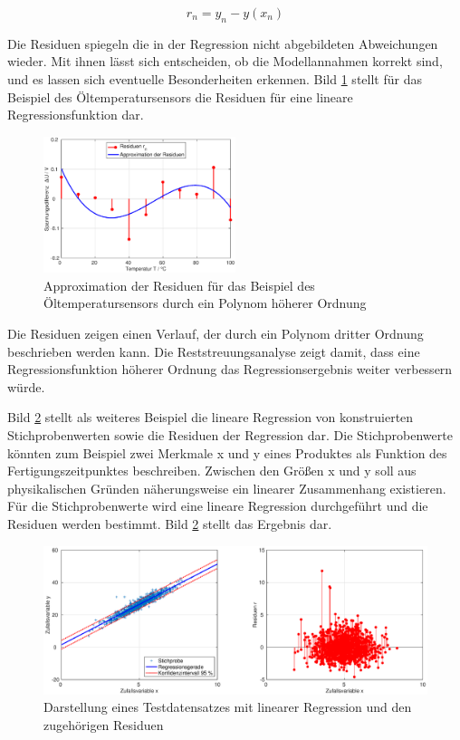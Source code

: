 \begin{equation}\label{eq:twelveonehundredthirtythree}
r_{n} =y_{n} -y(x_{n})
\end{equation}

\noindent Die Residuen spiegeln die in der Regression nicht abgebildeten Abweichungen wieder. Mit ihnen l\"{a}sst sich entscheiden, ob die Modellannahmen korrekt sind, und es lassen sich eventuelle Besonderheiten erkennen. Bild \ref{fig:RegressionLinearOeltemperatur9} stellt f\"{u}r das Beispiel des \"{O}ltemperatursensors die Residuen f\"{u}r eine lineare Regressionsfunktion dar.

\noindent 
\begin{figure}[H]
  \centerline{\includegraphics[width=0.5\textwidth]{Kapitel12/Bilder/image13}}
  \caption{Approximation der Residuen f\"{u}r das Beispiel des \"{O}ltemperatursensors durch ein Polynom h\"{o}herer Ordnung}
  \label{fig:RegressionLinearOeltemperatur9}
\end{figure}

\noindent Die Residuen zeigen einen Verlauf, der durch ein Polynom dritter Ordnung beschrieben werden kann. Die Reststreuungsanalyse zeigt damit, dass eine Regressionsfunktion h\"{o}herer Ordnung das Regressionsergebnis weiter verbessern w\"{u}rde. 

\noindent Bild \ref{fig:Residuenanalyse} stellt als weiteres Beispiel die lineare Regression von konstruierten Stichprobenwerten sowie die Residuen der Regression dar. Die Stichprobenwerte k\"{o}nnten zum Beispiel zwei Merkmale x und y eines Produktes als Funktion des Fertigungszeitpunktes beschreiben. Zwischen den Gr\"{o}{\ss}en x und y soll aus physikalischen Gr\"{u}nden n\"{a}herungsweise ein linearer Zusammenhang existieren. F\"{u}r die Stichprobenwerte wird eine lineare Regression durchgef\"{u}hrt und die Residuen werden bestimmt. Bild \ref{fig:Residuenanalyse} stellt das Ergebnis dar.

\noindent 
\begin{figure}[H]
  \centerline{\includegraphics[width=1\textwidth]{Kapitel12/Bilder/image14}}
  \caption{Darstellung eines Testdatensatzes mit linearer Regression und den zugeh\"{o}rigen Residuen}
  \label{fig:Residuenanalyse}
\end{figure}


